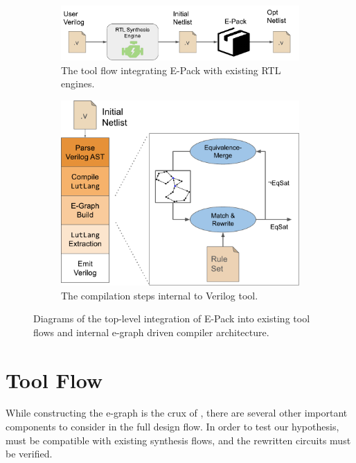\begin{figure}
    \begin{subfigure}{0.47\textwidth}
        \centering
        \includegraphics[width=\textwidth]{img/flow.pdf}
        \caption{The tool flow integrating E-Pack with existing RTL engines.}\label{fig:flow:rtl}
    \end{subfigure}
    \hfill\vspace{4mm}
    \begin{subfigure}{0.47\textwidth}
        \centering
        \includegraphics[width=\textwidth]{img/egraph.pdf}
        \caption{The compilation steps internal to \shortname{} Verilog tool.}\label{fig:flow:egraph}
    \end{subfigure}
    \caption{Diagrams of the top-level integration of E-Pack into existing tool flows and internal e-graph driven compiler architecture.}\label{fig:flow}
\end{figure}

\section{Tool Flow}\label{sec:flow}

While constructing the e-graph is the crux of \shortname{}, there are several
other important components to consider in the full design flow. In order to
test our hypothesis, \shortname{} must be compatible with existing synthesis
flows, and the rewritten circuits must be verified.

